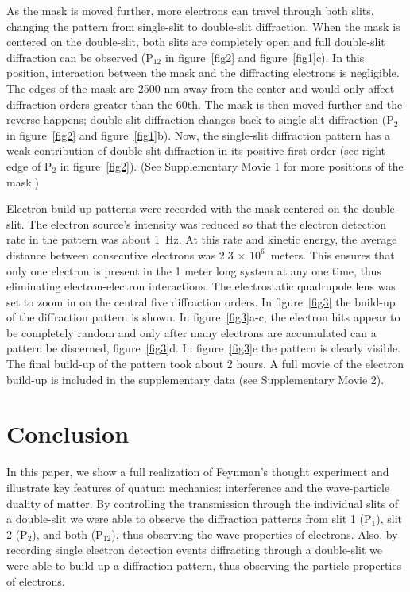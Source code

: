 \documentclass[12pt]{iopart}					%
\begin{document}
As the mask is moved further, more electrons can travel through both slits, changing the pattern from single-slit
to double-slit diffraction. When the mask is centered on the double-slit, both slits are completely open and 
full double-slit diffraction can be observed ($\textrm{P}_{12}$ in figure~\ref{fig2} and figure~\ref{fig1}c). In this position, interaction between the mask 
and the diffracting electrons is negligible. The edges of the mask are 2500 nm away from the center and would
only affect diffraction orders greater than the 60th. The mask is then moved further and the reverse happens; double-slit diffraction
changes back to single-slit diffraction ($\textrm{P}_{2}$ in figure~\ref{fig2} and figure~\ref{fig1}b).
Now, the single-slit diffraction pattern has a weak contribution of double-slit diffraction in its positive first order
(see right edge of $\textrm{P}_{2}$ in figure~\ref{fig2}).
(See Supplementary Movie 1 for more positions of the mask.)

Electron build-up patterns were recorded with the mask centered on the double-slit. The electron source's intensity was reduced
so that the electron detection rate in the pattern was about 1~Hz.  
At this rate and kinetic energy, the average distance between consecutive electrons was $2.3 \, \times \, 10^{6}$~meters.  This ensures
that only one electron is present in the 1 meter long system at any one time, thus eliminating electron-electron interactions.  The
electrostatic quadrupole lens was set to zoom in on the central five diffraction orders. In figure~\ref{fig3} the
build-up of the diffraction pattern is shown. In figure~\ref{fig3}a-c, the electron hits appear to be
completely random and only after many electrons are accumulated can a pattern be discerned, figure~\ref{fig3}d.
In figure~\ref{fig3}e the pattern is clearly visible.
The final build-up of the pattern took about 2 hours.
A full movie of the electron build-up is included in the supplementary data (see Supplementary Movie 2).



\section{Conclusion}
In this paper, we show a full realization of Feynman's thought experiment and illustrate key features of quatum mechanics:
interference and the wave-particle duality of matter.
By controlling the transmission through the individual slits of a double-slit we were able to observe the diffraction patterns from
slit 1 ($\textrm{P}_{1}$), slit 2 ($\textrm{P}_{2}$), and both ($\textrm{P}_{12}$), thus observing the wave properties of electrons.
Also, by recording single electron detection events diffracting through a double-slit we were able to build up a diffraction pattern,
thus observing the particle properties of electrons.
\end{document}
